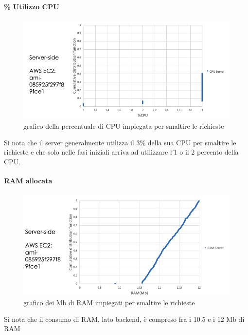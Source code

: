 \paragraph{\% Utilizzo CPU}
\begin{figure}[h!t]
    \centering
    \includegraphics[width=15cm]{Figure/quantitativa/CPU-srv.png}
    \caption{grafico della percentuale di CPU impiegata per smaltire le richieste}
    \label{fig:srvCPU}
\end{figure}
\FloatBarrier

Si nota che il server generalmente utilizza il 3\% della sua CPU per smaltire le richieste  e che solo nelle fasi iniziali arriva ad utilizzare l'1 o il 2 percento della CPU.

\paragraph{RAM allocata}
\begin{figure}[h!t]
    \centering
    \includegraphics[width=15cm]{Figure/quantitativa/quant_RAM-srv.png}
    \caption{grafico dei Mb di RAM impiegati per smaltire le richieste}
    \label{fig:srvRAM}
\end{figure}
\FloatBarrier

Si nota che il consumo di RAM, lato backend, è compreso fra i 10.5 e i 12 Mb di RAM

